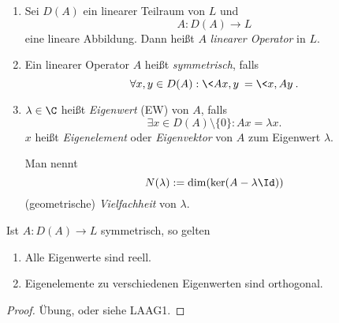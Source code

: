 \begin{df} \label{1.17}
	\begin{enumerate}[1)]
		\item
			Sei $D(A)$ ein linearer Teilraum von $L$ und
			\[
				A : D(A) \to L
			\]
			eine lineare Abbildung.
			Dann heißt $A$ \emph{linearer Operator} in $L$.
		\item
			Ein linearer Operator $A$ heißt \emph{symmetrisch}, falls
			\[
				\forall x,y \in D(A) : \<Ax,y\> = \<x,Ay\>.
			\]
		\item
			$\lambda \in \C$ heißt \emph{Eigenwert} (EW) von $A$, falls
			\[
				\exists x \in D(A) \setminus \{0\} : Ax = \lambda x.
			\]
			$x$ heißt \emph{Eigenelement} oder \emph{Eigenvektor} von $A$ zum Eigenwert $\lambda$.

			Man nennt
			\[
				N(\lambda) := \dim (\ker(A-\lambda \Id))
			\]
			(geometrische) \emph{Vielfachheit} von $\lambda$.
	\end{enumerate}
\end{df}

\begin{st} \label{1.18}
	Ist $A: D(A) \to L$ symmetrisch, so gelten
	\begin{enumerate}[1)]
		\item
			Alle Eigenwerte sind reell.
		\item
			Eigenelemente zu verschiedenen Eigenwerten sind orthogonal.
	\end{enumerate}
	\begin{proof}
		Übung, oder siehe LAAG1.
	\end{proof}
\end{st}

